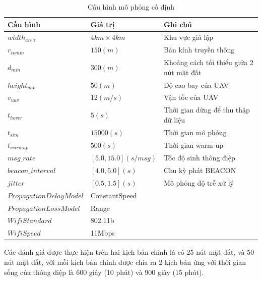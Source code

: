 \documentclass[a4paper]{article}
\begin{document}
\begin{table}[h]
\centering
\begin{tabular}{lll}
\toprule
\textbf{Cấu hình} & \textbf{Giá trị} & \textbf{Ghi chú} \\
\midrule
$width_{area}$ & $4 km \times 4 km$ & Khu vực giả lập \\
$r_{comm}$ & $150 (m)$ & Bán kính truyền thông \\
$d_{min}$ & $300 (m)$ & Khoảng cách tối thiểu giữa 2 nút mặt đất \\
$height_{uav}$ & $50 (m)$ & Độ cao bay của UAV\\
$v_{uav}$ & $12 (m/s)$ & Vận tốc của UAV\\
$t_{hover}$ & $5 (s)$ & Thời gian dừng để thu thập dữ liệu \\
$t_{sim}$ & $15000 (s)$ & Thời gian mô phỏng \\
$t_{warmup}$ & $500 (s)$ & Thời gian warm-up \\
$msg\_rate$ & $[5.0, 15.0] (s/msg)$ & Tốc độ sinh thông điệp \\
$beacon\_interval$ & $[4.0, 5.0] (s)$ & Chu kỳ phát BEACON \\
$jitter$ & $[0.5, 1.5] (s)$& Mô phỏng độ trễ xử lý\\
\midrule
$PropagationDelayModel$ & ConstantSpeed & \\
$PropagationLossModel$ & Range & \\
$Wifi Standard$ & 802.11b & \\
$Wifi Speed$ & 11Mbps & \\

\bottomrule
\end{tabular}
\caption{Cấu hình mô phỏng cố định}
\label{tab:static_simulation_config}
\end{table}

Các đánh giá được thực hiện trên hai kịch bản chính là có 25 nút mặt đất, và 50 nút mặt đất, với mỗi kịch bản chính được chia ra 2 kịch bản ứng với thời gian sống của thông điệp là 600 giây (10 phút) và 900 giây (15 phút).
\end{document}
